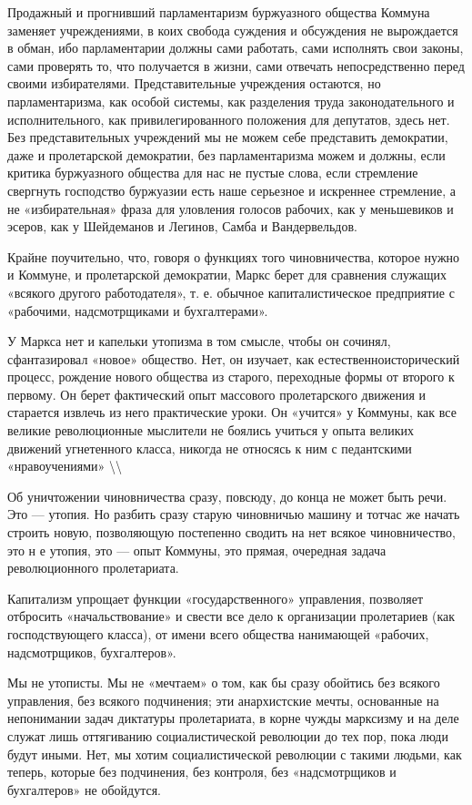 \documentclass[12pt]{article}
\newcommand\ellipsis{%
  \textbackslash\thinspace\textellipsis\textbackslash
}
\newcommand{\parnum}{(\arabic{parcount})}
\newcounter{parcount}
\newenvironment{parnumbers}{%
  \par%
  \everypar{\noindent \stepcounter{parcount}\marginpar[]{\parnum}}%
}{}
\begin{document}
\begin{parnumbers}
Продажный и прогнивший парламентаризм буржуазного общества Коммуна заменяет учреждениями, в коих свобода суждения и обсуждения не вырождается в обман, ибо парламентарии должны сами работать, сами исполнять свои законы, сами проверять то, что получается в жизни, сами отвечать непосредственно перед своими избирателями. Представительные учреждения остаются, но парламентаризма, как особой системы, как разделения труда законодательного и исполнительного, как привилегированного положения для депутатов, здесь нет. Без представительных учреждений мы не можем себе представить демократии, даже и пролетарской демократии, без парламентаризма можем и должны, если критика буржуазного общества для нас не пустые слова, если стремление свергнуть господство буржуазии есть наше серьезное и искреннее стремление, а не «избирательная» фраза для уловления голосов рабочих, как у меньшевиков и эсеров, как у Шейдеманов и Легинов, Самба и Вандервельдов.

Крайне поучительно, что, говоря о функциях того чиновничества, которое нужно и Коммуне, и пролетарской демократии, Маркс берет для сравнения служащих «всякого другого работодателя», т. е. обычное капиталистическое предприятие с «рабочими, надсмотрщиками и бухгалтерами».

У Маркса нет и капельки утопизма в том смысле, чтобы он сочинял, сфантазировал «новое» общество. Нет, он изучает, как естественноисторический процесс, рождение нового общества из старого, переходные формы от второго к первому. Он берет фактический опыт массового пролетарского движения и старается извлечь из него практические уроки. Он «учится» у Коммуны, как все великие революционные мыслители не боялись учиться у опыта великих движений угнетенного класса, никогда не относясь к ним с педантскими «нравоучениями» \ellipsis

Об уничтожении чиновничества сразу, повсюду, до конца не может быть речи. Это — утопия. Но разбить сразу старую чиновничью машину и тотчас же начать строить новую, позволяющую постепенно сводить на нет всякое чиновничество, это н е утопия, это — опыт Коммуны, это прямая, очередная задача революционного пролетариата.

Капитализм упрощает функции «государственного» управления, позволяет отбросить «начальствование» и свести все дело к организации пролетариев (как господствующего класса), от имени всего общества нанимающей «рабочих, надсмотрщиков, бухгалтеров».

Мы не утописты. Мы не «мечтаем» о том, как бы сразу обойтись без всякого управления, без всякого подчинения; эти анархистские мечты, основанные на непонимании задач диктатуры пролетариата, в корне чужды марксизму и на деле служат лишь оттягиванию социалистической революции до тех пор, пока люди будут иными. Нет, мы хотим социалистической революции с такими людьми, как теперь, которые без подчинения, без контроля, без «надсмотрщиков и бухгалтеров» не обойдутся.


\end{parnumbers}
\end{document}
